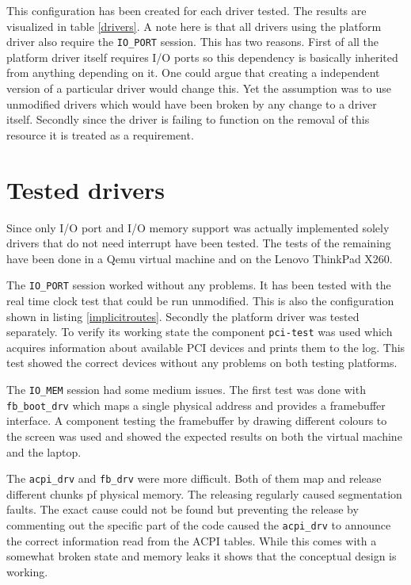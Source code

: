 \documentclass[
a4paper,
12pt,
notitlepage,
parskip=half,
DIV=11,
]{scrbook}
\begin{document}
		This configuration has been created for each driver tested.
		The results are visualized in table \ref{drivers}.
		A note here is that all drivers using the platform driver also require the \texttt{IO\_PORT} session.
		This has two reasons.
		First of all the platform driver itself requires I/O ports so this dependency is basically inherited from anything depending on it.
		One could argue that creating a independent version of a particular driver would change this.
		Yet the assumption was to use unmodified drivers which would have been broken by any change to a driver itself.
		Secondly since the driver is failing to function on the removal of this resource it is treated as a requirement.
		
		\section{Tested drivers}
		
		Since only I/O port and I/O memory support was actually implemented solely drivers that do not need interrupt have been tested.
		The tests of the remaining have been done in a Qemu virtual machine and on the Lenovo ThinkPad X260.
		
		The \texttt{IO\_PORT} session worked without any problems.
		It has been tested with the real time clock test that could be run unmodified.
		This is also the configuration shown in listing \ref{implicitroutes}.
		Secondly the platform driver was tested separately.
		To verify its working state the component \texttt{pci-test} was used which acquires information about available PCI devices and prints them to the log.
		This test showed the correct devices without any problems on both testing platforms.
		
		The \texttt{IO\_MEM} session had some medium issues.
		The first test was done with \texttt{fb\_boot\_drv} which maps a single physical address and provides a framebuffer interface.
		A component testing the framebuffer by drawing different colours to the screen was used and showed the expected results on both the virtual machine and the laptop.
		
		The \texttt{acpi\_drv} and \texttt{fb\_drv} were more difficult.
		Both of them map and release different chunks pf physical memory.
		The releasing regularly caused segmentation faults.
		The exact cause could not be found but preventing the release by commenting out the specific part of the code caused the \texttt{acpi\_drv} to announce the correct information read from the ACPI tables.
		While this comes with a somewhat broken state and memory leaks it shows that the conceptual design is working.
		
\end{document}
